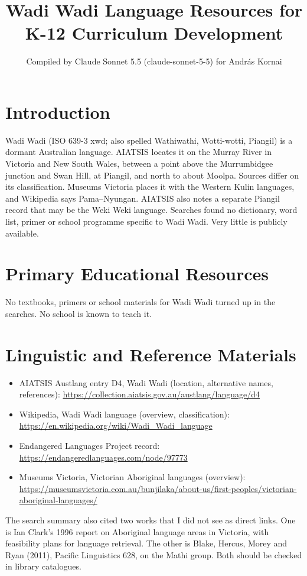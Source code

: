\documentclass[12pt]{article}
\title{Wadi Wadi Language Resources for K-12 Curriculum Development}
\author{Compiled by Claude Sonnet 5.5 (claude-sonnet-5-5) for Andr\'as Kornai}
\date{}
\begin{document}
\maketitle

\section{Introduction}
Wadi Wadi (ISO 639-3 xwd; also spelled Wathiwathi, Wotti-wotti, Piangil) is a dormant Australian language. AIATSIS locates it on the Murray River in Victoria and New South Wales, between a point above the Murrumbidgee junction and Swan Hill, at Piangil, and north to about Moolpa. Sources differ on its classification. Museums Victoria places it with the Western Kulin languages, and Wikipedia says Pama--Nyungan. AIATSIS also notes a separate Piangil record that may be the Weki Weki language. Searches found no dictionary, word list, primer or school programme specific to Wadi Wadi. Very little is publicly available.

\section{Primary Educational Resources}
No textbooks, primers or school materials for Wadi Wadi turned up in the searches. No school is known to teach it.

\section{Linguistic and Reference Materials}
\begin{itemize}
\item AIATSIS Austlang entry D4, Wadi Wadi (location, alternative names, references): \url{https://collection.aiatsis.gov.au/austlang/language/d4}
\item Wikipedia, Wadi Wadi language (overview, classification): \url{https://en.wikipedia.org/wiki/Wadi_Wadi_language}
\item Endangered Languages Project record: \url{https://endangeredlanguages.com/node/97773}
\item Museums Victoria, Victorian Aboriginal languages (overview): \url{https://museumsvictoria.com.au/bunjilaka/about-us/first-peoples/victorian-aboriginal-languages/}
\end{itemize}
The search summary also cited two works that I did not see as direct links. One is Ian Clark's 1996 report on Aboriginal language areas in Victoria, with feasibility plans for language retrieval. The other is Blake, Hercus, Morey and Ryan (2011), Pacific Linguistics 628, on the Mathi group. Both should be checked in library catalogues.
\end{document}
